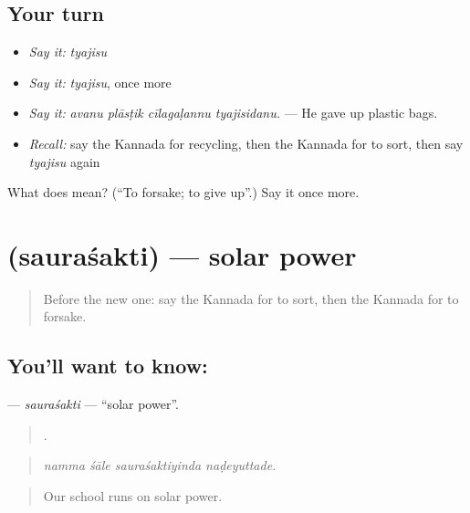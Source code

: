 \subsection*{Your turn}
\begin{itemize}
\raggedright
  \item \emph{Say it:} \emph{tyajisu}
  \item \emph{Say it:} \emph{tyajisu}, once more
  \item \emph{Say it:} \emph{avanu plāsṭik cīlagaḷannu tyajisidanu.} — He gave up plastic bags.
  \item \emph{Recall:} say the Kannada for recycling, then the Kannada for to sort, then say \emph{tyajisu} again
\end{itemize}

\begin{tcolorbox}[breakable,colback=teal!4,colframe=teal!35!black,title={Before you move on}]
What does  mean? (\textquotedblleft{}To forsake; to give up\textquotedblright{}.) Say it once more.
\end{tcolorbox}
\section[\texorpdfstring{\kn{ಸೌರಶಕ್ತಿ} (sauraśakti)}{ಸೌರಶಕ್ತಿ (sauraśakti)}]{ (sauraśakti) — solar power}

\label{lesson:KA-C474-saurasakti}



\begin{quote}
Before the new one: say the Kannada for to sort, then the Kannada for to forsake.
\end{quote}

\subsection*{You'll want to know: }
\textbf{} — \emph{sauraśakti} — \textquotedblleft{}solar power\textquotedblright{}.

\begin{quote}
   .
\end{quote}

\begin{quote}
\emph{namma śāle sauraśaktiyinda naḍeyuttade.}
\end{quote}

\begin{quote}
Our school runs on solar power.
\end{quote}

